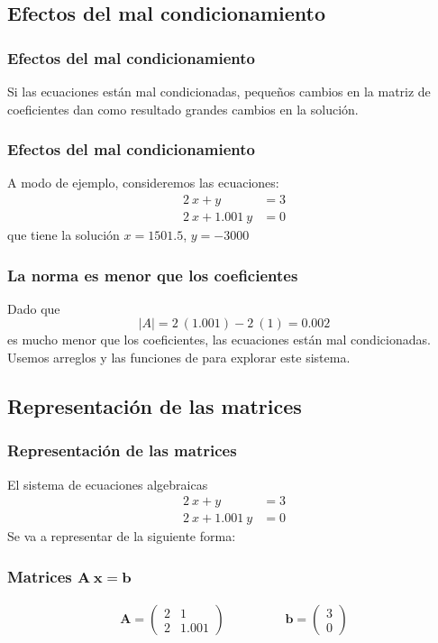 \subsection*{Efectos del mal condicionamiento}
\begin{frame}
\frametitle{Efectos del mal condicionamiento}
Si las ecuaciones están mal condicionadas, pequeños cambios en la matriz de coeficientes dan como resultado grandes cambios en la solución.
\end{frame}
\begin{frame}
\frametitle{Efectos del mal condicionamiento}
A modo de ejemplo, consideremos las ecuaciones:
\begin{align*}
2 \: x + y &= 3 \\
2 \: x + 1.001 \:y &= 0
\end{align*}
que tiene la solución $x = 1501.5$, $y = -3000$
\end{frame}
\begin{frame}[fragile]
\frametitle{La norma es menor que los coeficientes}
Dado que 
\[ \vert A \vert = 2 \: (1.001) - 2 \: (1) = 0.002 \]
 es mucho menor que los coeficientes, las ecuaciones están mal condicionadas.
\\
\bigskip
\pause
Usemos arreglos y las funciones de \python{} para explorar este sistema.
\end{frame}
\subsection*{Representación de las matrices}
\begin{frame}
\frametitle{Representación de las matrices}
El sistema de ecuaciones algebraicas
\begin{align*}
2 \: x + y &= 3 \\
2 \: x + 1.001 \:y &= 0
\end{align*}
Se va a representar de la siguiente forma:
\end{frame}
\begin{frame}
\frametitle{Matrices $\mathbf{A \: x =  b}$}
\begin{align*}
\mathbf{A} = \begin{pmatrix}
2 & 1 \\
2 & 1.001
\end{pmatrix}
\hspace{2cm}
\mathbf{b} = \begin{pmatrix}
3 \\
0
\end{pmatrix}
\end{align*}
\end{frame}
